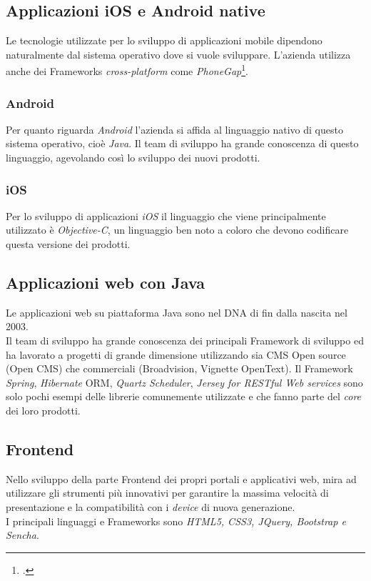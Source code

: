 \subsection{Applicazioni iOS e Android native}
Le tecnologie utilizzate per lo sviluppo di applicazioni mobile dipendono naturalmente dal sistema operativo dove si vuole sviluppare. L'azienda utilizza anche dei \glspl{Framework} \emph{cross-platform} come \emph{PhoneGap}\footcite{phonegap}.
\subsubsection{Android}
Per quanto riguarda \emph{Android} l'azienda si affida al linguaggio nativo di questo sistema operativo, cioè \emph{Java}. 
Il team di sviluppo ha grande conoscenza di questo linguaggio, agevolando così lo sviluppo dei nuovi prodotti.
\subsubsection{iOS}
Per lo sviluppo di applicazioni \emph{iOS} il linguaggio che viene principalmente utilizzato è \emph{Objective-C}, un linguaggio ben noto a coloro che devono codificare questa versione dei prodotti.

\subsection{Applicazioni web con Java}
Le applicazioni web su piattaforma Java sono nel DNA di \azienda{} fin dalla nascita nel 2003. \\
Il team di sviluppo ha grande conoscenza dei principali \gls{Framework} di sviluppo ed ha lavorato a progetti di grande dimensione utilizzando sia \gls{CMS} \gls{Open source} (Open CMS) che commerciali (Broadvision, Vignette OpenText).
Il \gls{Framework} \emph{Spring}, \emph{Hibernate} \gls{ORM}, \emph{Quartz Scheduler}, \emph{Jersey for RESTful Web services} sono solo pochi esempi delle librerie comunemente utilizzate e che fanno parte del \emph{core} dei loro prodotti.

\subsection{Frontend}
Nello sviluppo della parte \gls{Frontend} dei propri portali e applicativi web, \azienda{} mira ad utilizzare gli strumenti più innovativi per garantire la massima velocità di presentazione e la compatibilità con i \emph{device} di nuova generazione. \\
I principali linguaggi e \glspl{Framework} sono \emph{HTML5, CSS3, JQuery, Bootstrap e Sencha}.

